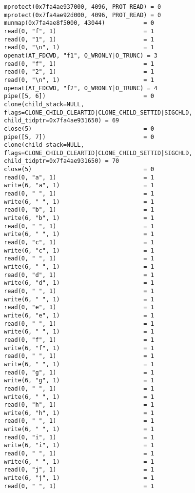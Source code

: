 \begin{verbatim}
mprotect(0x7fa4ae937000, 4096, PROT_READ) = 0
mprotect(0x7fa4ae92d000, 4096, PROT_READ) = 0
munmap(0x7fa4ae8f5000, 43044)           = 0
read(0, "f", 1)                         = 1
read(0, "1", 1)                         = 1
read(0, "\n", 1)                        = 1
openat(AT_FDCWD, "f1", O_WRONLY|O_TRUNC) = 3
read(0, "f", 1)                         = 1
read(0, "2", 1)                         = 1
read(0, "\n", 1)                        = 1
openat(AT_FDCWD, "f2", O_WRONLY|O_TRUNC) = 4
pipe([5, 6])                            = 0
clone(child_stack=NULL, flags=CLONE_CHILD_CLEARTID|CLONE_CHILD_SETTID|SIGCHLD, child_tidptr=0x7fa4ae931650) = 69
close(5)                                = 0
pipe([5, 7])                            = 0
clone(child_stack=NULL, flags=CLONE_CHILD_CLEARTID|CLONE_CHILD_SETTID|SIGCHLD, child_tidptr=0x7fa4ae931650) = 70
close(5)                                = 0
read(0, "a", 1)                         = 1
write(6, "a", 1)                        = 1
read(0, " ", 1)                         = 1
write(6, " ", 1)                        = 1
read(0, "b", 1)                         = 1
write(6, "b", 1)                        = 1
read(0, " ", 1)                         = 1
write(6, " ", 1)                        = 1
read(0, "c", 1)                         = 1
write(6, "c", 1)                        = 1
read(0, " ", 1)                         = 1
write(6, " ", 1)                        = 1
read(0, "d", 1)                         = 1
write(6, "d", 1)                        = 1
read(0, " ", 1)                         = 1
write(6, " ", 1)                        = 1
read(0, "e", 1)                         = 1
write(6, "e", 1)                        = 1
read(0, " ", 1)                         = 1
write(6, " ", 1)                        = 1
read(0, "f", 1)                         = 1
write(6, "f", 1)                        = 1
read(0, " ", 1)                         = 1
write(6, " ", 1)                        = 1
read(0, "g", 1)                         = 1
write(6, "g", 1)                        = 1
read(0, " ", 1)                         = 1
write(6, " ", 1)                        = 1
read(0, "h", 1)                         = 1
write(6, "h", 1)                        = 1
read(0, " ", 1)                         = 1
write(6, " ", 1)                        = 1
read(0, "i", 1)                         = 1
write(6, "i", 1)                        = 1
read(0, " ", 1)                         = 1
write(6, " ", 1)                        = 1
read(0, "j", 1)                         = 1
write(6, "j", 1)                        = 1
read(0, " ", 1)                         = 1

\end{verbatim}
